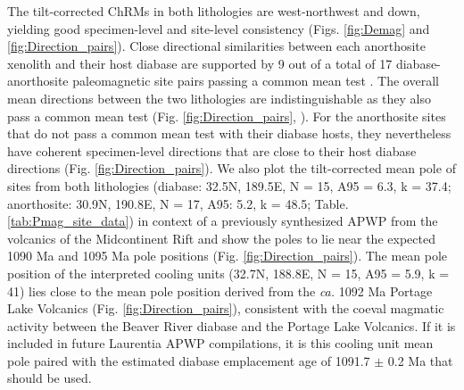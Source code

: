 The tilt-corrected ChRMs in both lithologies are west-northwest and down, yielding good specimen-level and site-level consistency (Figs. \ref{fig:Demag} and \ref{fig:Direction_pairs}). Close directional similarities between each anorthosite xenolith and their host diabase are supported by 9 out of a total of 17 diabase-anorthosite paleomagnetic site pairs passing a common mean test \citep{McFadden1990a}. The overall mean directions between the two lithologies are indistinguishable as they also pass a common mean test (Fig. \ref{fig:Direction_pairs}, \cite{McFadden1990a}). For the anorthosite sites that do not pass a common mean test with their diabase hosts, they nevertheless have coherent specimen-level directions that are close to their host diabase directions (Fig. \ref{fig:Direction_pairs}). We also plot the tilt-corrected mean pole of sites from both lithologies (diabase: 32.5\textdegree N, 189.5\textdegree E, N = 15, A95 = 6.3, k = 37.4; anorthosite: 30.9\textdegree N, 190.8\textdegree E, N = 17, A95: 5.2, k = 48.5; Table. \ref{tab:Pmag_site_data}) in context of a previously synthesized APWP from the volcanics of the Midcontinent Rift \citep{Swanson-Hysell2019a} and show the poles to lie near the expected 1090 Ma and 1095 Ma pole positions (Fig. \ref{fig:Direction_pairs}). The mean pole position of the interpreted cooling units (32.7\textdegree N, 188.8\textdegree E, N = 15, A95 = 5.9, k = 41) lies close to the mean pole position derived from the \textit{ca.} 1092 Ma Portage Lake Volcanics (Fig. \ref{fig:Direction_pairs}), consistent with the coeval magmatic activity between the Beaver River diabase and the Portage Lake Volcanics. If it is included in future Laurentia APWP compilations, it is this cooling unit mean pole paired with the estimated diabase emplacement age of 1091.7 $\pm$ 0.2 Ma that should be used.


